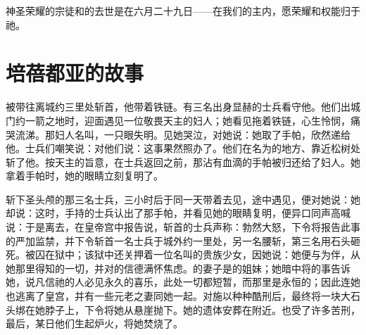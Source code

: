 神圣荣耀的宗徒和的去世是在六月二十九日——在我们的主内，愿荣耀和权能归于祂。\par


\section{培蓓都亚的故事}

被带往离城约三里处斩首，他带着铁链。有三名出身显赫的士兵看守他。他们出城门约一箭之地时，迎面遇见一位敬畏天主的妇人；她看见拖着铁链，心生怜悯，痛哭流涕。那妇人名叫，一只眼失明。见她哭泣，对她说：她取了手帕，欣然递给他。士兵们嘲笑说：对他们说：这事果然照办了。他们在名为的地方、靠近松树处斩了他。按天主的旨意，在士兵返回之前，那沾有血滴的手帕被归还给了妇人。她拿着手帕时，她的眼睛立刻复明了。\par

斩下圣头颅的那三名士兵，三小时后于同一天带着去见，途中遇见，便对她说：她却说：这时，手持的士兵认出了那手帕，并看见她的眼睛复明，便异口同声高喊说：于是离去，在皇帝宫中报告说，斩首的士兵声称：勃然大怒，下令将报告此事的严加监禁，并下令斩首一名士兵于城外约一里处，另一名腰斩，第三名用石头砸死。被囚在狱中；该狱中还关押着一位名叫的贵族少女，因她说：她便与为伴，从她那里得知的一切，并对的信德满怀焦虑。的妻子是的姐妹；她暗中将的事告诉她，说凡信祂的人必见永久的喜乐，此处一切都短暂，而那里是永恒的；因此连她也逃离了皇宫，并有一些元老之妻同她一起。对施以种种酷刑后，最终将一块大石头绑在她脖子上，下令将她从悬崖抛下。她的遗体安葬在附近。也受了许多苦刑，最后，某日他们生起炉火，将她焚烧了。\par

